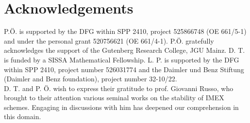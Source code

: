 \documentclass[USenglish]{article}
\newcommand{\1}{\begin{pmatrix}
		1\\
		1
\end{pmatrix}}
\begin{document}
	\section*{Acknowledgements}
	P.Ö. is supported by the DFG within SPP 2410, project  525866748 (OE 661/5-1) and under the personal grant 520756621 (OE 661/4-1).  P.Ö. gratefully acknowledges the 		 	support of the Gutenberg Research College, JGU Mainz.
	D. T. is funded by a SISSA Mathematical Fellowship.
	L. P. is supported by the DFG within SPP 2410, project number 526031774 and the Daimler und Benz Stiftung (Daimler and Benz foundation), project number 32-10/22.\\
	D. T. and P. Ö. wish to express their gratitude to prof. Giovanni Russo, who brought to their attention various seminal works on the stability of IMEX schemes. Engaging in discussions with him has deepened our comprehension in this domain.
	
	
\end{document}
